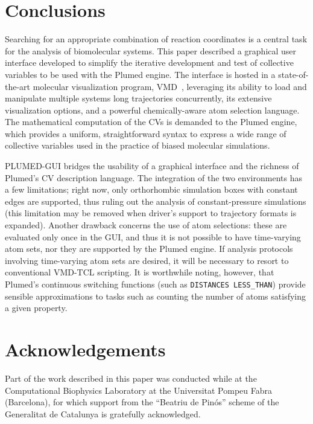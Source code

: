 \documentclass[preprint,12pt]{elsarticle}
\begin{document}
\section{Conclusions}

Searching for an appropriate combination of reaction coordinates is a
central task for the analysis of biomolecular systems.  This paper
described a graphical user interface developed to simplify the
iterative development and test of collective variables to be used with
the Plumed engine. The interface is hosted in a state-of-the-art
molecular visualization program,
VMD~\cite{Humphrey_Dalke_Schulten_1996}, leveraging its ability to
load and manipulate multiple systems long trajectories
concurrently, its extensive visualization options, and a powerful
chemically-aware atom selection language. The mathematical computation
of the CVs is demanded to the Plumed engine, which
provides a uniform, straightforward syntax to express a wide range of
collective variables used in the practice of biased molecular simulations.

PLUMED-GUI bridges the usability of a graphical interface and the
richness of Plumed's CV description language.  The integration of the
two environments has a few limitations; right now, only orthorhombic
simulation boxes with constant edges are supported, thus ruling out
the analysis of constant-pressure simulations (this limitation may be
removed when driver's support to trajectory formats is
expanded). Another drawback concerns the use of atom selections: these
are evaluated only once in the GUI, and thus it is not possible to
have time-varying atom sets, nor they are supported by the Plumed
engine.  If analysis protocols involving time-varying atom sets are
desired, it will be necessary to resort to conventional VMD-TCL
scripting. It is worthwhile noting, however, that Plumed's continuous
switching functions (such as \texttt{DISTANCES LESS\_THAN})
provide sensible approximations to tasks such as counting the number
of atoms satisfying a given property.







\section{Acknowledgements}

Part of the work described in this paper was conducted while at the
Computational Biophysics Laboratory at the Universitat Pompeu Fabra
(Barcelona), for which support from the ``Beatriu de Pin\'os'' scheme
of the Generalitat de Catalunya is gratefully acknowledged.







\end{document}
